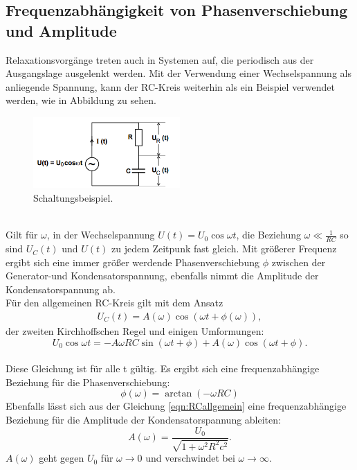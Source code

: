 \subsection{Frequenzabhängigkeit von Phasenverschiebung und Amplitude}
Relaxationsvorgänge treten auch in Systemen auf, die periodisch aus der Ausgangslage ausgelenkt werden.
Mit der Verwendung einer Wechselspannung als anliegende Spannung, kann der RC-Kreis weiterhin als ein Beispiel verwendet werden, wie in Abbildung zu sehen.\\ %
\begin{figure}
  \centering
  \includegraphics[width=0.5\textwidth]{schaltbild2.PNG}
  \caption{Schaltungsbeispiel.\cite{skript}}
  \label{fig:schaltung2}
\end{figure}\\
Gilt für $\omega$, in der Wechselspannung $U(t)=U_0\cos\omega t$, die Beziehung $\omega\ll\frac{1}{RC}$
so sind $U_C(t)$ und $U(t)$ zu jedem Zeitpunk fast gleich.
Mit größerer Frequenz ergibt sich eine immer größer werdende Phasenverschiebung $\phi$ zwischen der Generator-und Kondensatorspannung,
ebenfalls nimmt die Amplitude der Kondensatorspannung ab.\\
Für den allgemeinen RC-Kreis gilt mit dem Ansatz
\begin{align}
  U_C(t)=A(\omega)\cos(\omega t+\phi(\omega)),
\end{align}
der zweiten Kirchhoffschen Regel und einigen Umformungen:
\begin{equation}
  U_0\cos\omega t =-A\omega RC\sin(\omega t+\phi)+A(\omega)\cos(\omega t+\phi).\label{eqn:RCallgemein}
\end{equation}\\
Diese Gleichung ist für alle t gültig.
Es ergibt sich eine frequenzabhängige Beziehung für die Phasenverschiebung:
\begin{equation}
  \phi(\omega)=\arctan(-\omega RC)
\end{equation}
Ebenfalls lässt sich aus der Gleichung \eqref{eqn:RCallgemein} eine frequenzabhängige Beziehung für die Amplitude der Kondensatorspannung ableiten:
\begin{equation}
  A(\omega)=\frac{U_0}{\sqrt{1+\omega^{2}R^2c^2}}.\label{eqn:amplitude}
\end{equation}
$A(\omega)$ geht gegen $U_0$ für $\omega\longrightarrow 0$ und verschwindet bei $\omega\longrightarrow\infty$.
